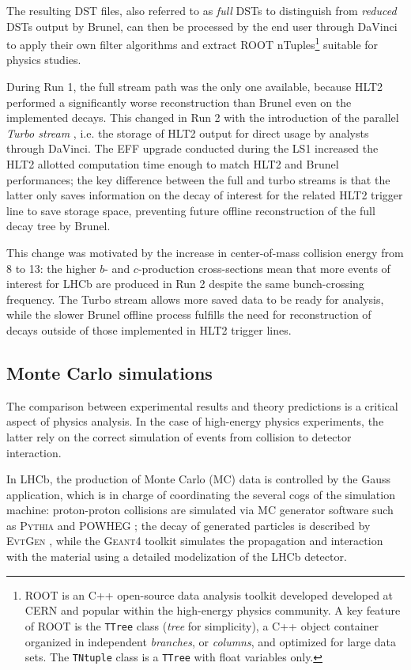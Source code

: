 The resulting DST files, also referred to as \textit{full} DSTs to distinguish from \textit{reduced} DSTs output by Brunel, can then be processed by the end user through DaVinci to apply their own filter algorithms and extract ROOT nTuples\footnote{ROOT \cite{ANTCHEVA20092499} is an C++ open-source data analysis toolkit developed developed at CERN and popular within the high-energy physics community. A key feature of ROOT is the \texttt{TTree} class (\textit{tree} for simplicity), a C++ object container organized in independent \textit{branches}, or \textit{columns}, and optimized for large data sets. The \texttt{TNtuple} class is a \texttt{TTree} with float variables only.} suitable for physics studies.

During Run 1, the full stream path was the only one available, because HLT2 performed a significantly worse reconstruction than Brunel even on the implemented decays.
This changed in Run 2 with the introduction of the parallel \textit{Turbo stream} \cite{Benson_2015}, i.e. the storage of HLT2 output for direct usage by analysts through DaVinci.
The EFF upgrade conducted during the LS1 increased the HLT2 allotted computation time enough to match HLT2 and Brunel performances;
the key difference between the full and turbo streams is that the latter only saves information on the decay of interest for the related HLT2 trigger line to save storage space, preventing future offline reconstruction of the full decay tree by Brunel.

This change was motivated by the increase in center-of-mass collision energy from \SI{8}{\tev} to \SI{13}{\tev}: the higher $b$- and $c$-production cross-sections mean that more events of interest for LHCb are produced in Run 2 despite the same bunch-crossing frequency.
The Turbo stream allows more saved data to be ready for analysis, while the slower Brunel offline process fulfills the need for reconstruction of decays outside of those implemented in HLT2 trigger lines.

\subsection{Monte Carlo simulations}
\label{sec:2:monte_carlo}
The comparison between experimental results and theory predictions is a critical aspect of physics analysis.
In the case of high-energy physics experiments, the latter rely on the correct simulation of events from collision to detector interaction.

In LHCb, the production of Monte Carlo (MC) data is controlled by the Gauss application, which is in charge of coordinating the several cogs of the simulation machine:
proton-proton collisions are simulated via MC generator software such as \textsc{Pythia} \cite{Pythia2015} and \textsc{POWHEG} \cite{Alioli:2010xd}; the decay of generated particles is described by \textsc{EvtGen} \cite{Ryd:2005zz}, while the \textsc{Geant4} toolkit \cite{AGOSTINELLI2003250} simulates the propagation and interaction with the material using a detailed modelization of the LHCb detector.


